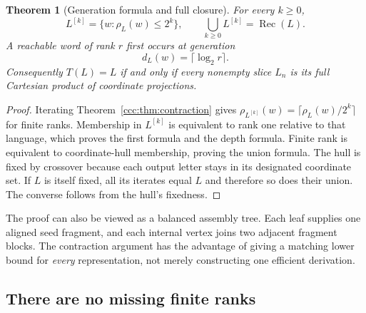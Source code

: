 \documentclass[11pt,letterpaper]{article}
\newtheorem{theorem}{Theorem}[section]
\theoremstyle{definition}
\theoremstyle{remark}
\newcommand{\rec}{\operatorname{Rec}}
\newcommand{\gen}[2]{#1^{[#2]}}
\newcommand{\rank}{\rho}
\begin{document}
\begin{theorem}[Generation formula and full closure]\label{ccc:thm:generation}
For every $k\geq0$,
\begin{equation}
 \gen Lk=\{w:\rank_L(w)\leq2^k\},
 \qquad
 \bigcup_{k\geq0}\gen Lk=\rec(L).
 \label{ccc:eq:generation}
\end{equation}
A reachable word of rank $r$ first occurs at generation
\begin{equation}
 d_L(w)=\lceil\log_2 r\rceil.
 \label{ccc:eq:depth}
\end{equation}
Consequently $T(L)=L$ if and only if every nonempty slice $L_n$ is its full
Cartesian product of coordinate projections.
\end{theorem}
\begin{proof}
Iterating Theorem~\ref{ccc:thm:contraction} gives
$\rank_{\gen Lk}(w)=\lceil\rank_L(w)/2^k\rceil$ for finite ranks. Membership
in $\gen Lk$ is equivalent to rank one relative to that language, which proves
the first formula and the depth formula. Finite rank is equivalent to
coordinate-hull membership, proving the union formula. The hull is fixed by
crossover because each output letter stays in its designated coordinate set.
If $L$ is itself fixed, all its iterates equal $L$ and therefore so does their
union. The converse follows from the hull's fixedness.
\end{proof}

The proof can also be viewed as a balanced assembly tree. Each leaf supplies
one aligned seed fragment, and each internal vertex joins two adjacent
fragment blocks. The contraction argument has the advantage of giving a
matching lower bound for \emph{every} representation, not merely constructing
one efficient derivation.

\subsection{There are no missing finite ranks}
\end{document}
